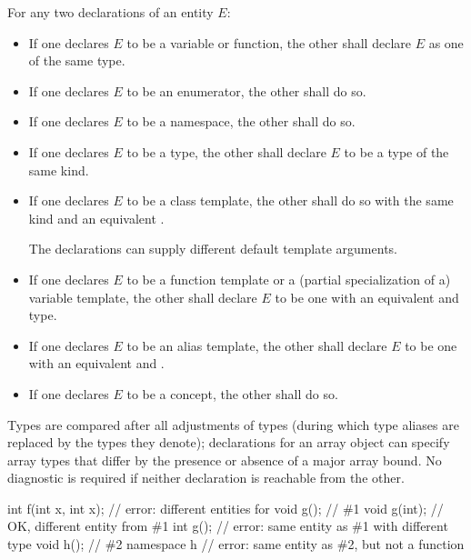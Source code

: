 \pnum
{}%
%
For any two declarations of an entity $E$:
\begin{itemize}
\item
If one declares $E$ to be a variable or function,
the other shall declare $E$ as one of the same type.
\item
If one declares $E$ to be an enumerator, the other shall do so.
\item
If one declares $E$ to be a namespace, the other shall do so.
\item
If one declares $E$ to be a type,
the other shall declare $E$ to be a type of the same kind.
\item
If one declares $E$ to be a class template,
the other shall do so with the same kind and
an equivalent .
\begin{note}
The declarations can supply different default template arguments.
\end{note}
\item
If one declares $E$ to be a function template or
a (partial specialization of a) variable template,
the other shall declare $E$ to be one
with an equivalent  and type.
\item
If one declares $E$ to be an alias template,
the other shall declare $E$ to be one with
an equivalent  and .
\item
If one declares $E$ to be a concept, the other shall do so.
\end{itemize}
Types are compared after all adjustments of types (during which
type aliases are replaced by the types they denote);
declarations for an array
object can specify array types that differ by the presence or absence of
a major array bound.
No diagnostic is required if neither declaration is reachable from the other.
\begin{example}
\begin{codeblock}
int f(int x, int x);    // error: different entities for 
void g();               // \#1
void g(int);            // OK, different entity from \#1
int g();                // error: same entity as \#1 with different type
void h();               // \#2
namespace h {}          // error: same entity as \#2, but not a function
\end{codeblock}
\end{example}

